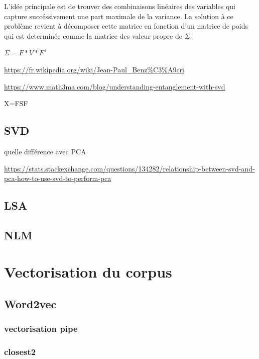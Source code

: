 \documentclass[
]{book}
\begin{document}
L'idée principale est de trouver des combinaisons linéaires des variables qui capture succéssivement une part maximale de la variance. La solution à ce problème revient à décomposer cette matrice en fonction d'un matrice de poids qui est determinée comme la matrice des valeur propre de \(\Sigma\).

\(\Sigma=F*V*F^\top\)

\url{https://fr.wikipedia.org/wiki/Jean-Paul_Benz\%C3\%A9cri}

\url{https://www.math3ma.com/blog/understanding-entanglement-with-svd}

X=FSF

\hypertarget{svd}{%
\section{SVD}\label{svd}}

quelle différence avec PCA

\url{https://stats.stackexchange.com/questions/134282/relationship-between-svd-and-pca-how-to-use-svd-to-perform-pca}

\hypertarget{lsa}{%
\section{LSA}\label{lsa}}

\hypertarget{nlm}{%
\section{NLM}\label{nlm}}

\hypertarget{vectorisation-du-corpus}{%
\chapter{Vectorisation du corpus}\label{vectorisation-du-corpus}}

\hypertarget{word2vec}{%
\section{Word2vec}\label{word2vec}}

\hypertarget{vectorisation-pipe}{%
\subsection{vectorisation pipe}\label{vectorisation-pipe}}

\hypertarget{closest2}{%
\subsection{closest2}\label{closest2}}
\end{document}
